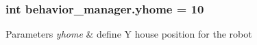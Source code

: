 \subsubsection[{\texorpdfstring{yhome}{yhome}}]{\setlength{\rightskip}{0pt plus 5cm}int behavior\+\_\+manager.\+yhome = 10}\hypertarget{namespacebehavior__manager_a8a02239f22d228c9aea6e13b43a5cdee}{}\label{namespacebehavior__manager_a8a02239f22d228c9aea6e13b43a5cdee}

\begin{DoxyParams}{Parameters}
{\em yhome} & define Y house position for the robot \\
\hline
\end{DoxyParams}
